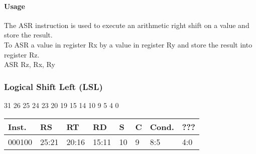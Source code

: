 \documentclass[12pt]{article}
\begin{document}
    \paragraph{Usage}
    \begin{flushleft}
    The ASR instruction is used to execute an arithmetic right shift on a value and store the result.\\
    \vspace{1em}
    To ASR a value in register Rx by a value in register Ry and store the result into register Rz.\\
    \vspace{1em}
    ASR Rz, Rx, Ry
    \end{flushleft}
   
   

   


    \newpage
    \subsubsection{Logical Shift Left (LSL)}
    
    \hspace{1.6cm}31 \hspace{1.2cm}26 \hspace{.075cm}25 \hspace{.15cm}24 \hspace{.075cm}23 \hspace{.875cm}20 \hspace{.04cm}19 \hspace{.8cm}15 \hspace{.04cm}14 \hspace{.8cm}10 \hspace{.04cm}9 \hspace{1.15cm}5 \hspace{.04cm}4 \hspace{1.25cm}0
    \vspace{-.25cm}
    \begin{center}
        \begin{tabular}{ |p{1.8cm}|p{1.5cm}|p{1.5cm}|p{1.5cm}|p{0.3cm}|p{0.3cm}|p{1.5cm}|p{1.5cm}| }
            \hline
            \textbf{Inst.} & \textbf{RS}& \textbf{RT} & \textbf{RD} & \textbf{S} & \textbf{C} & \textbf{Cond.} & ???\\
            \hline
            000100& 25:21 & 20:16 & 15:11 & 10 & 9 & 8:5 &4:0\\
            \hline
        \end{tabular}
    \end{center}
    
\end{document}
